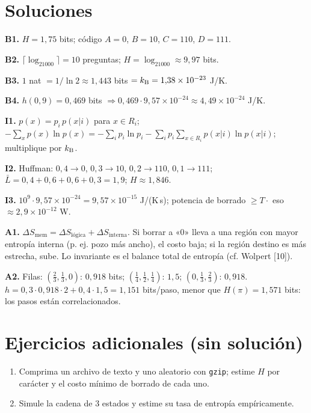\documentclass[11pt,a4paper]{article}
\begin{document}
\section{Soluciones}
\begin{solucion}
\textbf{B1.} $H=1{,}75$ bits; código $A{=}0$, $B{=}10$, $C{=}110$, $D{=}111$.

\textbf{B2.} $\lceil\log_21000\rceil=10$ preguntas; $H=\log_21000\approx9{,}97$ bits.

\textbf{B3.} $1$ nat $=1/\ln2\approx1{,}443$ bits $=k_{\mathrm B}=1{,}38\times10^{-23}$ J/K.

\textbf{B4.} $h(0{,}9)=0{,}469$ bits $\Rightarrow0{,}469\cdot9{,}57\times10^{-24}\approx4{,}49\times10^{-24}$ J/K.

\textbf{I1.} $p(x)=p_i\,p(x|i)$ para $x\in R_i$; $-\sum_xp(x)\ln p(x)=-\sum_ip_i\ln p_i-\sum_ip_i\sum_{x\in R_i}p(x|i)\ln p(x|i)$; multiplique por $k_{\mathrm B}$.

\textbf{I2.} Huffman: $0{,}4\to0$, $0{,}3\to10$, $0{,}2\to110$, $0{,}1\to111$; $\bar L=0{,}4+0{,}6+0{,}6+0{,}3=1{,}9$; $H\approx1{,}846$.

\textbf{I3.} $10^9\cdot9{,}57\times10^{-24}=9{,}57\times10^{-15}$ J/(K\,s); potencia de borrado $\ge T\cdot$ eso $\approx2{,}9\times10^{-12}$ W.

\textbf{A1.} $\Delta S_{\text{mem}}=\Delta S_{\text{lógica}}+\Delta S_{\text{interna}}$. Si borrar a «0» lleva a una región con mayor entropía interna (p. ej. pozo más ancho), el costo baja; si la región destino es más estrecha, sube. Lo invariante es el balance total de entropía (cf. Wolpert [10]).

\textbf{A2.} Filas: $(\frac23,\frac13,0)$: $0{,}918$ bits; $(\frac14,\frac12,\frac14)$: $1{,}5$; $(0,\frac13,\frac23)$: $0{,}918$. $h=0{,}3\cdot0{,}918\cdot2+0{,}4\cdot1{,}5=1{,}151$ bits/paso, menor que $H(\pi)=1{,}571$ bits: los pasos están correlacionados.
\end{solucion}

\section{Ejercicios adicionales (sin solución)}
\begin{enumerate}[label=\textbf{P\arabic*.}]
\item Comprima un archivo de texto y uno aleatorio con \texttt{gzip}; estime $H$ por carácter y el costo mínimo de borrado de cada uno.
\item Simule la cadena de 3 estados y estime su tasa de entropía empíricamente.
\end{enumerate}
\end{document}
